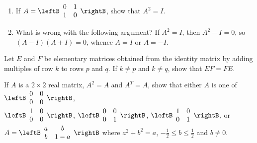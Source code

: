 \begin{multicols}{2}
\begin{supex}
[\textit{Hint}: If $a^{2} + b^{2} = 1$, then $a = \cos \theta$, $b = \sin \theta$ for some $\theta$. Use 
\begin{equation*}
\cos(\theta - \phi) = \cos \theta \cos \phi + \sin \theta \sin \phi.]
\end{equation*}

\end{supex}

\begin{supex}

\begin{enumerate}[label={\alph*.}]
\item If $A = \leftB \begin{array}{rr}
0 & 1 \\
1 & 0
\end{array} \rightB$,
 show that $A^{2} = I$.

\item What is wrong with the following argument? If $A^{2} = I$, then $A^{2} - I = 0$, so $(A - I)(A + I) = 0$, whence $A = I$ or $A = -I$.

\end{enumerate}
\end{supex}

\begin{supex}
Let $E$ and $F$ be elementary matrices obtained from the identity matrix by adding multiples of row $k$ to rows $p$ and $q$. If $k \neq p$ and $k \neq q$, show that $EF = FE$.

\end{supex}

\begin{supex}
If $A$ is a $2 \times 2$ real matrix, $A^{2} = A$ and $A^{T} = A$, show that either $A$ is one of $\leftB \begin{array}{rr}
0 & 0 \\
0 & 0
\end{array} \rightB$, \\ $\leftB \begin{array}{rr}
1 & 0 \\
0 & 0
\end{array} \rightB$, $\leftB \begin{array}{rr}
0 & 0 \\
0 & 1
\end{array} \rightB$, $\leftB \begin{array}{rr}
1 & 0 \\
0 & 1
\end{array} \rightB$, or $A = \leftB \begin{array}{cc}
a & b \\
b & 1 - a
\end{array} \rightB$
 where $a^{2} + b^{2} = a$, $-\frac{1}{2} \leq b \leq \frac{1}{2}$ and $b \neq 0$.


\end{supex}
\end{multicols}
